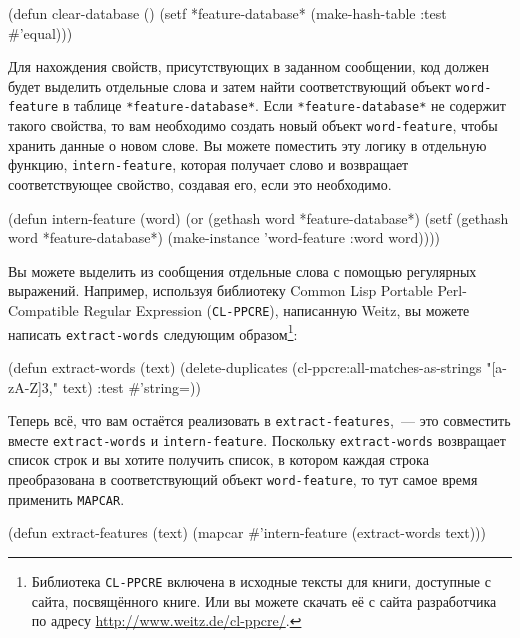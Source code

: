 \begin{myverb}
(defun clear-database ()
  (setf *feature-database* (make-hash-table :test #'equal)))
\end{myverb}

Для нахождения свойств, присутствующих в заданном сообщении, код должен будет выделить
отдельные слова и затем найти соответствующий объект \lstinline{word-feature} в таблице
\lstinline{*feature-database*}.  Если \lstinline{*feature-database*} не содержит такого свойства, то вам
необходимо создать новый объект \lstinline{word-feature}, чтобы хранить данные о новом слове.  Вы
можете поместить эту логику в отдельную функцию, \lstinline{intern-feature}, которая получает
слово и возвращает соответствующее свойство, создавая его, если это необходимо.

\begin{myverb}
(defun intern-feature (word)
  (or (gethash word *feature-database*)
      (setf (gethash word *feature-database*)
            (make-instance 'word-feature :word word))))
\end{myverb}

Вы можете выделить из сообщения отдельные слова с помощью регулярных выражений.  Например,
используя библиотеку Common Lisp Portable Perl-Compatible Regular Expression
(\lstinline{CL-PPCRE}), написанную Weitz, вы можете написать \lstinline{extract-words} следующим
образом\footnote{Библиотека \lstinline{CL-PPCRE} включена в исходные тексты для книги,
  доступные с сайта, посвящённого книге.  Или вы можете скачать её с сайта разработчика по
  адресу \url{http://www.weitz.de/cl-ppcre/}.}:

\begin{myverb}
(defun extract-words (text)
  (delete-duplicates
   (cl-ppcre:all-matches-as-strings "[a-zA-Z]{3,}" text)
   :test #'string=))
\end{myverb}

Теперь всё, что вам остаётся реализовать в \lstinline{extract-features},~--- это совместить
вместе \lstinline{extract-words} и \lstinline{intern-feature}.  Поскольку \lstinline{extract-words}
возвращает список строк и вы хотите получить список, в котором каждая строка преобразована
в соответствующий объект \lstinline{word-feature}, то тут самое время применить \lstinline{MAPCAR}.

\begin{myverb}
(defun extract-features (text)
  (mapcar #'intern-feature (extract-words text)))
\end{myverb}

